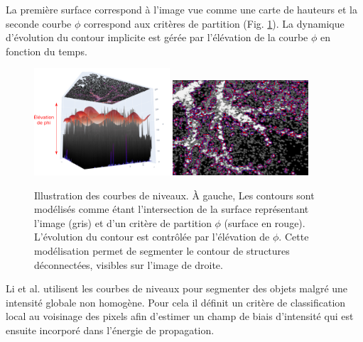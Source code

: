        La première surface correspond à l'image vue comme une carte de hauteurs et la seconde courbe $\phi$ correspond aux critères de partition (Fig. \ref{fig:level_set}). La dynamique d'évolution du contour implicite est gérée par l'élévation de la courbe $\phi$ en fonction du temps. 

      \begin{figure}[h]
        \centering
        \includegraphics[width=0.45\textwidth]{Images/levelSet_1.png}
        \includegraphics[width=0.45\textwidth]{Images/levelSet_2.png}
        \caption{Illustration des courbes de niveaux. À gauche, Les contours sont modélisés comme étant l'intersection de la surface représentant l'image (gris) et d'un critère de partition $\phi$ (surface en rouge). L'évolution du contour est contrôlée par l'élévation de $\phi$. Cette modélisation permet de segmenter le contour de structures déconnectées, visibles sur l'image de droite.}
        \label{fig:level_set}
      \end{figure}

      Li \cite{Li2011_mri_level_set} et al. utilisent les courbes de niveaux pour segmenter des objets malgré une intensité globale non homogène. Pour cela il définit un critère de classification local au voisinage des pixels afin d'estimer un champ de biais d'intensité qui est ensuite incorporé dans l'énergie de propagation.


